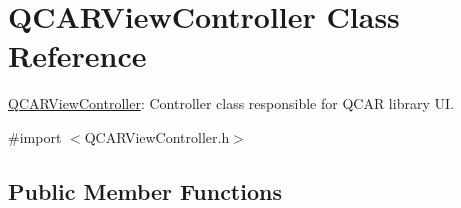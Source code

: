 \hypertarget{interface_q_c_a_r_view_controller}{
\section{\-Q\-C\-A\-R\-View\-Controller \-Class \-Reference}
\label{interface_q_c_a_r_view_controller}
}


\hyperlink{interface_q_c_a_r_view_controller}{\-Q\-C\-A\-R\-View\-Controller}\-: \-Controller class responsible for \-Q\-C\-A\-R library \-U\-I.  




{\ttfamily \#import $<$\-Q\-C\-A\-R\-View\-Controller.\-h$>$}

\subsection*{\-Public \-Member \-Functions}
